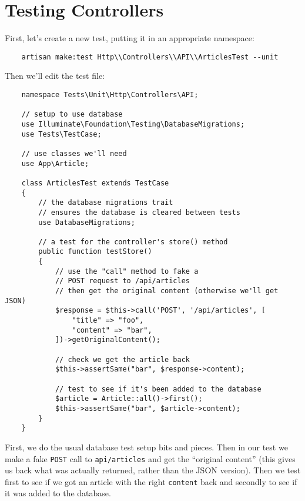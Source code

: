 \pagebreak


\section{Testing Controllers}

First, let's create a new test, putting it in an appropriate namespace:

\begin{verbatim}
    artisan make:test Http\\Controllers\\API\\ArticlesTest --unit
\end{verbatim}

Then we'll edit the test file:

\begin{verbatim}
    namespace Tests\Unit\Http\Controllers\API;

    // setup to use database
    use Illuminate\Foundation\Testing\DatabaseMigrations;
    use Tests\TestCase;

    // use classes we'll need
    use App\Article;

    class ArticlesTest extends TestCase
    {
        // the database migrations trait
        // ensures the database is cleared between tests
        use DatabaseMigrations;

        // a test for the controller's store() method
        public function testStore()
        {
            // use the "call" method to fake a
            // POST request to /api/articles
            // then get the original content (otherwise we'll get JSON)
            $response = $this->call('POST', '/api/articles', [
                "title" => "foo",
                "content" => "bar",
            ])->getOriginalContent();

            // check we get the article back
            $this->assertSame("bar", $response->content);

            // test to see if it's been added to the database
            $article = Article::all()->first();
            $this->assertSame("bar", $article->content);
        }
    }
\end{verbatim}

First, we do the usual database test setup bits and pieces. Then in our test we make a fake \texttt{POST} call to \texttt{api/articles} and get the ``original content'' (this gives us back what was actually returned, rather than the JSON version). Then we test first to see if we got an article with the right \texttt{content} back and secondly to see if it was added to the database.
\\

